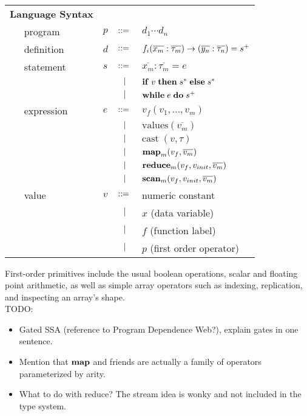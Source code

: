 \documentclass[preprint]{sigplanconf}
\begin{document}
\begin{tabular}{m{0.1cm}m{1.2cm}m{0.1cm}m{0.2cm}p{4.7cm}}
 \multicolumn{2}{l}{\textbf{Language Syntax}} & & &  \\
& program & $p$ &  $::=$   &  $d_1 \cdots d_n $ \\[3.5pt]
& definition & $d$ & $::=$ & $f_i(\overline{x_m} : \overline{\tau_m}) \rightarrow (\overline{y_n} : \overline{\tau_n}) =s^{\small{+}}$ \\[3.5pt]
& statement  & $s$ & $::=$ & $\overline{x_m} : \overline{\tau_m} = e $\\[2pt]
&            &     & $\ \ | \ \ $    & $\mbox{\textbf{if}} \;v\; \mbox{\textbf{then}} \;s^*\; \mbox{\textbf{else}} \;s^*$ \\[2pt]
&            &     & $\ \ | \ \ $    & $\mbox{\textbf{while}} \;e\; \mbox{\textbf{do}} \;s^+\;  $ \\[2pt]
& expression & $e$ & $::=$ & $ v_{f}(v_1, \ldots, v_m)$ \\[2pt]
&            &     & $\ \ | \ \ $    & $\textrm{values} (\overline{v_m})$ \\[2pt]
&            &     & $\ \ | \ \ $    & $\textrm{cast} \; (v, \tau)$ \\[2pt] 
&            &     & $\ \ | \ \ $    & $\mbox{\textbf{map}}_m (v_{f},\overline{v_m})$ \\[2pt]
&            &     & $\ \ | \ \ $    & $\mbox{\textbf{reduce}}_m (v_{f}, v_{init}, \overline{v_m})$ \\[2pt]
&            &     & $\ \ | \ \ $    & $\mbox{\textbf{scan}}_m (v_{f}, v_{init}, \overline{v_m})$ \\[3.5pt]
& value      & $v$ & $::=$ & numeric constant\\[2pt]
&            &     & $\ \ | \ \ $    &  $x$  \quad \small{(data variable)} \\[2pt]
&            &     & $\ \ | \ \ $    &  $f$  \quad \small{(function label)} \\[2pt]
&            &     & $\ \ | \ \ $    &  $p$ \quad \small{(first order operator)} \\[2pt]
\end{tabular}
First-order primitives include the usual boolean operations, scalar and floating point arithmetic, as well as simple array operators such as indexing, replication, and inspecting an array's shape. 
\\TODO: 
\begin{itemize}
\item Gated SSA (reference to Program Dependence Web?), explain gates in one sentence. 
\item Mention that $\mbox{\textbf{map}}$ and friends are actually a family of operators parameterized by arity. 
\item What to do with reduce? The stream idea is wonky and not included in the type system. 
\end{itemize} 
\end{document}
